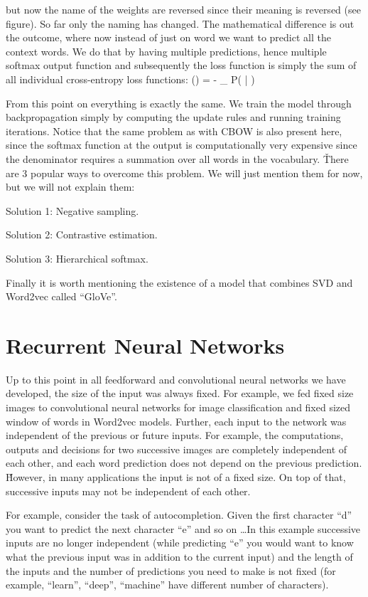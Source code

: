 but now the name of the weights are reversed since their meaning is reversed (see figure). So far only the naming has
changed. The mathematical difference is out the outcome, where now instead of just on word we want to predict all the
context words. We do that by having multiple predictions, hence multiple softmax output function and subsequently the
loss function is simply the sum of all individual cross-entropy loss functions:
\bse
{}(\theta) = - \sum_{} \ln P( | )
\ese

From this point on everything is exactly the same. We train the model through backpropagation simply by computing the
update rules and running training iterations. Notice that the same problem as with CBOW is also present here, since
the softmax function at the output is computationally very expensive since the denominator requires a summation over
all words in the vocabulary. \v

There are 3 popular ways to overcome this problem. We will just mention them for now, but we will not explain them:
\bit
\item Solution 1: Negative sampling.
\item Solution 2: Contrastive estimation.
\item Solution 3: Hierarchical softmax.
\eit

Finally it is worth mentioning the existence of a model that combines SVD and Word2vec called ``GloVe''.

\section{Recurrent Neural Networks}

Up to this point in all feedforward and convolutional neural networks we have developed, the size of the input was
always fixed. For example, we fed fixed size images to convolutional neural networks for image classification and
fixed sized window of words in Word2vec models. Further, each input to the network was independent of the previous or
future inputs. For example, the computations, outputs and decisions for two successive images are completely
independent of each other, and each word prediction does not depend on the previous prediction. \v

However, in many applications the input is not of a fixed size. On top of that, successive inputs may not be
independent of each other.

\be
For example, consider the task of autocompletion. Given the first character ``d'' you want to predict the next
character ``e'' and so on \ldots In this example successive inputs are no longer independent (while predicting ``e''
you would want to know what the previous input was in addition to the current input) and the length of the inputs and
the number of predictions you need to make is not fixed (for example, ``learn'', ``deep'', ``machine'' have different
number of characters).


